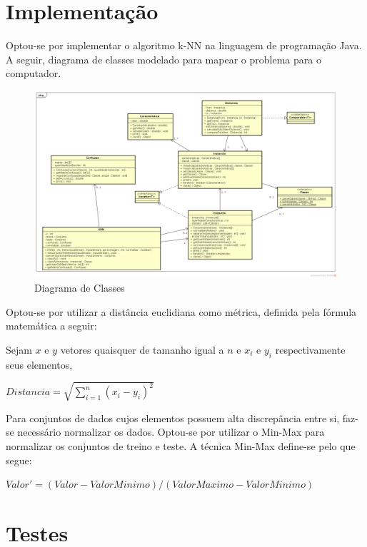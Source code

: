 \documentclass[12pt]{article}
\begin{document}
	\section{Implementação}\label{sec:implementacao}

		Optou-se por implementar o algoritmo k-NN na linguagem de programação Java. A seguir, diagrama de classes modelado para mapear o problema para o computador.

		\begin{landscape}
		\centering
		\begin{figure}[p]
		\includegraphics[width=1.4\textwidth]{classDiagram.png}
		\caption{Diagrama de Classes}
		\label{fig:classDiagram}
		\end{figure}
		\end{landscape}
		\restoregeometry

		Optou-se por utilizar a distância euclidiana como métrica, definida pela fórmula matemática a seguir:

		\noindent Sejam $x$ e $y$ vetores quaisquer de tamanho igual a $n$ e $x_{i}$ e $y_{i}$ respectivamente seus elementos,

		\quad\quad $Distancia = \sqrt{\sum_{i=1}^{n}(x_i - y_i)^2}$

		Para conjuntos de dados cujos elementos possuem alta discrepância entre si, faz-se necessário normalizar os dados. Optou-se por utilizar o Min-Max para normalizar os conjuntos de treino e teste. A técnica Min-Max define-se pelo que segue:

		\quad\quad $Valor' = (Valor - ValorMinimo)/(ValorMaximo - ValorMinimo)$

	\section{Testes}\label{sec:testes}
\end{document}

